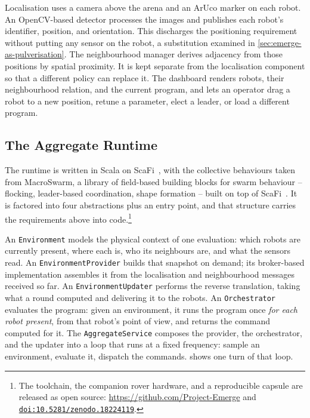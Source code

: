 Localisation uses a camera above the arena and an ArUco marker on each robot.
An OpenCV-based detector processes the images and publishes each robot's identifier, position, and orientation.
%
This discharges the positioning requirement without putting any sensor on the robot, a substitution examined in \cref{sec:emerge-as-pulverisation}.
%
The neighbourhood manager derives adjacency from those positions by spatial proximity.
It is kept separate from the localisation component so that a different policy can replace it.
%
The dashboard renders robots, their neighbourhood relation, and the current program,
and lets an operator drag a robot to a new position, retune a parameter, elect a leader, or load a different program.

\subsection{The Aggregate Runtime}
\label{subsec:emerge-runtime}

The runtime is written in Scala on ScaFi~\cite{casadei2022scafi},
with the collective behaviours taken from MacroSwarm,
a library of field-based building blocks for swarm behaviour -- flocking, leader-based coordination, shape formation -- built on top of ScaFi~\cite{DBLP:conf/coordination/AguzziCV23}.
%
It is factored into four abstractions plus an entry point, and that structure carries the requirements above into code.\footnote{The toolchain, the companion rover hardware, and a reproducible capsule are released as open source: \url{https://github.com/Project-Emerge} and \href{https://doi.org/10.5281/zenodo.18224119}{\nolinkurl{doi:10.5281/zenodo.18224119}}.}

An \texttt{Environment} models the physical context of one evaluation:
which robots are currently present, where each is, who its neighbours are, and what the sensors read.
%
An \texttt{EnvironmentProvider} builds that snapshot on demand;
its broker-based implementation assembles it from the localisation and neighbourhood messages received so far.
%
An \texttt{EnvironmentUpdater} performs the reverse translation, taking what a round computed and delivering it to the robots.
%
An \texttt{Orchestrator} evaluates the program:
given an environment, it runs the program once \emph{for each robot present}, from that robot's point of view, and returns the command computed for it.
%
The \texttt{AggregateService} composes the provider, the orchestrator, and the updater into a loop that runs at a fixed frequency: sample an environment, evaluate it, dispatch the commands.
%
 shows one turn of that loop.

